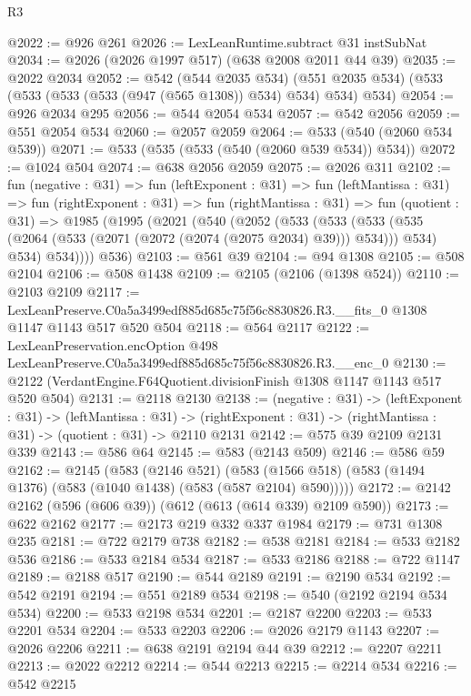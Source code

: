 \begin{lexlean}{R3}
\begin{coremodule}
@2022 := @926 @261
@2026 := LexLeanRuntime.subtract @31 instSubNat
@2034 := @2026 (@2026 @1997 @517) (@638 @2008 @2011 @44 @39)
@2035 := @2022 @2034
@2052 := @542
    (@544 @2035 @534)
    (@551 @2035 @534)
    (@533 (@533 (@533 (@533 (@947 (@565 @1308)) @534) @534) @534) @534)
@2054 := @926 @2034 @295
@2056 := @544 @2054 @534
@2057 := @542 @2056
@2059 := @551 @2054 @534
@2060 := @2057 @2059
@2064 := @533 (@540 (@2060 @534 @539))
@2071 := @533 (@535 (@533 (@540 (@2060 @539 @534)) @534))
@2072 := @1024 @504
@2074 := @638 @2056 @2059
@2075 := @2026 @311
@2102 := fun (negative : @31) =>
  fun (leftExponent : @31) =>
  fun (leftMantissa : @31) =>
  fun (rightExponent : @31) =>
  fun (rightMantissa : @31) =>
  fun (quotient : @31) =>
  @1985
    (@1995
      (@2021
        (@540
          (@2052
            (@533
              (@533
                (@533 (@535 (@2064 (@533 (@2071 (@2072 (@2074 (@2075 @2034) @39))) @534))) @534)
                @534)
              @534))))
      @536)
@2103 := @561 @39
@2104 := @94 @1308
@2105 := @508 @2104
@2106 := @508 @1438
@2109 := @2105 (@2106 (@1398 @524))
@2110 := @2103 @2109
@2117 := LexLeanPreserve.C0a5a3499edf885d685c75f56c8830826.R3.__fits_0
    @1308
    @1147
    @1143
    @517
    @520
    @504
@2118 := @564 @2117
@2122 := LexLeanPreservation.encOption
    @498
    LexLeanPreserve.C0a5a3499edf885d685c75f56c8830826.R3.__enc_0
@2130 := @2122 (VerdantEngine.F64Quotient.divisionFinish @1308 @1147 @1143 @517 @520 @504)
@2131 := @2118 @2130
@2138 := (negative : @31) ->
  (leftExponent : @31) ->
  (leftMantissa : @31) ->
  (rightExponent : @31) -> (rightMantissa : @31) -> (quotient : @31) -> @2110 @2131
@2142 := @575 @39 @2109 @2131 @339
@2143 := @586 @64
@2145 := @583 (@2143 @509)
@2146 := @586 @59
@2162 := @2145
    (@583
      (@2146 @521)
      (@583 (@1566 @518) (@583 (@1494 @1376) (@583 (@1040 @1438) (@583 (@587 @2104) @590)))))
@2172 := @2142 @2162 (@596 (@606 @39)) (@612 (@613 (@614 @339) @2109 @590))
@2173 := @622 @2162
@2177 := @2173 @219 @332 @337 @1984
@2179 := @731 @1308 @235
@2181 := @722 @2179 @738
@2182 := @538 @2181
@2184 := @533 @2182 @536
@2186 := @533 @2184 @534
@2187 := @533 @2186
@2188 := @722 @1147
@2189 := @2188 @517
@2190 := @544 @2189
@2191 := @2190 @534
@2192 := @542 @2191
@2194 := @551 @2189 @534
@2198 := @540 (@2192 @2194 @534 @534)
@2200 := @533 @2198 @534
@2201 := @2187 @2200
@2203 := @533 @2201 @534
@2204 := @533 @2203
@2206 := @2026 @2179 @1143
@2207 := @2026 @2206
@2211 := @638 @2191 @2194 @44 @39
@2212 := @2207 @2211
@2213 := @2022 @2212
@2214 := @544 @2213
@2215 := @2214 @534
@2216 := @542 @2215

\end{coremodule}
\end{lexlean}
